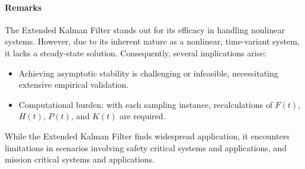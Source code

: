 \paragraph*{Remarks}
The Extended Kalman Filter stands out for its efficacy in handling nonlinear systems. 
However, due to its inherent nature as a nonlinear, time-variant system, it lacks a steady-state solution. 
Consequently, several implications arise:
\begin{itemize}
    \item Achieving asymptotic stability is challenging or infeasible, necessitating extensive empirical validation.
    \item Computational burden: with each sampling instance, recalculations of $F(t)$, $H(t)$, $P(t)$, and $K(t)$ are required.
\end{itemize}
While the Extended Kalman Filter finds widespread application, it encounters limitations in scenarios involving safety critical systems and applications, and mission critical systems and applications. 
